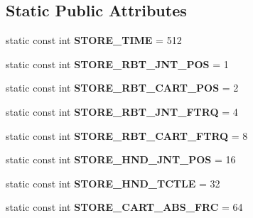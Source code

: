 \subsection*{Static Public Attributes}
\begin{DoxyCompactItemize}
\item 
\hypertarget{classkukadu_1_1SensorStorage_a05ce1bf702c832c2b5e7f52066534e8f}{static const int {\bfseries S\-T\-O\-R\-E\-\_\-\-T\-I\-M\-E} = 512}\label{classkukadu_1_1SensorStorage_a05ce1bf702c832c2b5e7f52066534e8f}

\item 
\hypertarget{classkukadu_1_1SensorStorage_a070f1783a6c3350f8a23d74903840ec8}{static const int {\bfseries S\-T\-O\-R\-E\-\_\-\-R\-B\-T\-\_\-\-J\-N\-T\-\_\-\-P\-O\-S} = 1}\label{classkukadu_1_1SensorStorage_a070f1783a6c3350f8a23d74903840ec8}

\item 
\hypertarget{classkukadu_1_1SensorStorage_a88de0ab747ea7a103fcf4365ea75be45}{static const int {\bfseries S\-T\-O\-R\-E\-\_\-\-R\-B\-T\-\_\-\-C\-A\-R\-T\-\_\-\-P\-O\-S} = 2}\label{classkukadu_1_1SensorStorage_a88de0ab747ea7a103fcf4365ea75be45}

\item 
\hypertarget{classkukadu_1_1SensorStorage_add023dda2818acad70d3c841e73f5930}{static const int {\bfseries S\-T\-O\-R\-E\-\_\-\-R\-B\-T\-\_\-\-J\-N\-T\-\_\-\-F\-T\-R\-Q} = 4}\label{classkukadu_1_1SensorStorage_add023dda2818acad70d3c841e73f5930}

\item 
\hypertarget{classkukadu_1_1SensorStorage_a7d212ebdda136ab741bc52643aba4d44}{static const int {\bfseries S\-T\-O\-R\-E\-\_\-\-R\-B\-T\-\_\-\-C\-A\-R\-T\-\_\-\-F\-T\-R\-Q} = 8}\label{classkukadu_1_1SensorStorage_a7d212ebdda136ab741bc52643aba4d44}

\item 
\hypertarget{classkukadu_1_1SensorStorage_a51ed1a7670752c1364cfd92ad26cff2a}{static const int {\bfseries S\-T\-O\-R\-E\-\_\-\-H\-N\-D\-\_\-\-J\-N\-T\-\_\-\-P\-O\-S} = 16}\label{classkukadu_1_1SensorStorage_a51ed1a7670752c1364cfd92ad26cff2a}

\item 
\hypertarget{classkukadu_1_1SensorStorage_ad42b6b0b8ad5186068fb59765f289796}{static const int {\bfseries S\-T\-O\-R\-E\-\_\-\-H\-N\-D\-\_\-\-T\-C\-T\-L\-E} = 32}\label{classkukadu_1_1SensorStorage_ad42b6b0b8ad5186068fb59765f289796}

\item 
\hypertarget{classkukadu_1_1SensorStorage_aa737207c828d766772106bbb6ec59a81}{static const int {\bfseries S\-T\-O\-R\-E\-\_\-\-C\-A\-R\-T\-\_\-\-A\-B\-S\-\_\-\-F\-R\-C} = 64}\label{classkukadu_1_1SensorStorage_aa737207c828d766772106bbb6ec59a81}


\end{DoxyCompactItemize}
